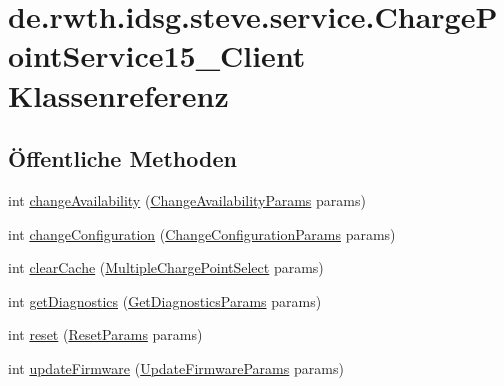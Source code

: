\hypertarget{classde_1_1rwth_1_1idsg_1_1steve_1_1service_1_1_charge_point_service15___client}{\section{de.\+rwth.\+idsg.\+steve.\+service.\+Charge\+Point\+Service15\+\_\+\+Client Klassenreferenz}
\label{classde_1_1rwth_1_1idsg_1_1steve_1_1service_1_1_charge_point_service15___client}
}
\subsection*{Öffentliche Methoden}
\begin{DoxyCompactItemize}
\item 
int \hyperlink{classde_1_1rwth_1_1idsg_1_1steve_1_1service_1_1_charge_point_service15___client_a4cbf52b72240a920b7ca06fda659bca8}{change\+Availability} (\hyperlink{classde_1_1rwth_1_1idsg_1_1steve_1_1web_1_1dto_1_1ocpp12_1_1_change_availability_params}{Change\+Availability\+Params} params)
\item 
int \hyperlink{classde_1_1rwth_1_1idsg_1_1steve_1_1service_1_1_charge_point_service15___client_ad28911fd98b6de3b020a365cac57a6ae}{change\+Configuration} (\hyperlink{classde_1_1rwth_1_1idsg_1_1steve_1_1web_1_1dto_1_1ocpp12_1_1_change_configuration_params}{Change\+Configuration\+Params} params)
\item 
int \hyperlink{classde_1_1rwth_1_1idsg_1_1steve_1_1service_1_1_charge_point_service15___client_a1349f938cb4da9ce1c3a02be58904a51}{clear\+Cache} (\hyperlink{classde_1_1rwth_1_1idsg_1_1steve_1_1web_1_1dto_1_1common_1_1_multiple_charge_point_select}{Multiple\+Charge\+Point\+Select} params)
\item 
int \hyperlink{classde_1_1rwth_1_1idsg_1_1steve_1_1service_1_1_charge_point_service15___client_acd7e66a2c39c83ec2dedec056aa8a9a6}{get\+Diagnostics} (\hyperlink{classde_1_1rwth_1_1idsg_1_1steve_1_1web_1_1dto_1_1common_1_1_get_diagnostics_params}{Get\+Diagnostics\+Params} params)
\item 
int \hyperlink{classde_1_1rwth_1_1idsg_1_1steve_1_1service_1_1_charge_point_service15___client_a418f7209c5ec5aae956ac876ead76a69}{reset} (\hyperlink{classde_1_1rwth_1_1idsg_1_1steve_1_1web_1_1dto_1_1ocpp12_1_1_reset_params}{Reset\+Params} params)
\item 
int \hyperlink{classde_1_1rwth_1_1idsg_1_1steve_1_1service_1_1_charge_point_service15___client_a7f17088a0c28a9bceb391df80a840be1}{update\+Firmware} (\hyperlink{classde_1_1rwth_1_1idsg_1_1steve_1_1web_1_1dto_1_1common_1_1_update_firmware_params}{Update\+Firmware\+Params} params)

\end{DoxyCompactItemize}

